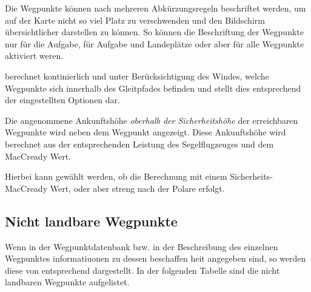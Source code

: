 Die Wegpunkte können nach mehreren Abkürzungsregeln beschriftet werden, um auf 
 der Karte nicht so viel Platz zu verschwenden und den Bildschirm  übersichtlicher darstellen zu können. 
So können die Beschriftung der Wegpunkte nur für die Aufgabe, für Aufgabe und Landeplätze oder aber für alle Wegpunkte aktiviert weren.


\xc berechnet kontinierlich und unter Berücksichtigung des Windes, welche Wegpunkte sich innerhalb des Gleitpfades befinden und stellt dies entsprechend der eingestellten Optionen dar.

Die angenommene Ankunftshöhe {\em oberhalb der Sicherheitshöhe} der erreichbaren  Wegpunkte wird neben dem Wegpunkt  angezeigt. Diese Ankunftshöhe wird berechnet aus der entsprechenden Leistung des Segelflugzeuges und dem MacCready Wert. 

 Hierbei kann gewählt werden, ob die Berechnung mit einem Sicherheits-MacCready Wert, oder aber streng nach der Polare erfolgt.

\subsection*{Nicht landbare Wegpunkte}
Wenn in der  Wegpunktdatenbank bzw. in der Beschreibung des einzelnen Wegpunktes informatiuonen zu dessen beschaffen heit angegeben sind, so werden diese von \xc   entsprechend dargestellt. In der folgenden Tabelle  sind die nicht landbaren Wegpunkte aufgelistet. 

